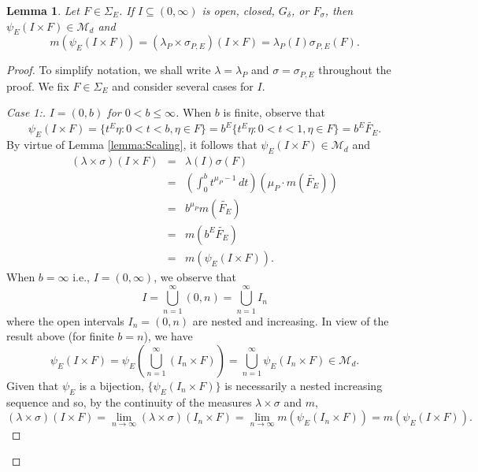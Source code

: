 \documentclass[11pt]{article}
\newtheorem{lemma}[theorem]{Lemma}
\newcommand*{\myproofname}{Proof}
\newenvironment{subproof}[1][\myproofname]{\begin{proof}[#1]\renewcommand*{\qedsymbol}{$\mathbin{/\mkern-6mu/}$}}{\end{proof}}
\begin{document}
\begin{lemma}\label{lem:SpecialRectangle}
Let $F\in\Sigma_E$. If $I\subseteq (0,\infty)$ is open, closed, $G_\delta$, or $F_\sigma$, then $\psi_E(I\times F)\in\mathcal{M}_d$ and
\begin{equation}\label{eq:SpecialRectangle}
m(\psi_E(I\times F))=(\lambda_P\times\sigma_{P,E})(I\times F)=\lambda_P(I)\sigma_{P,E}(F).
\end{equation}
\end{lemma}
\begin{proof}
To simplify notation, we shall write $\lambda=\lambda_P$ and $\sigma=\sigma_{P,E}$ throughout the proof. We fix $F\in\Sigma_E$ and consider several cases for $I$.\\

\begin{subproof}[Case 1:]\textit{$I=(0,b)$ for $0<b\leq \infty$.} When $b$ is finite, observe that
\begin{equation*}
\psi_E(I\times F)=\{t^E\eta:0<t<b,\eta\in F\}=b^E\{t^E\eta:0<t<1,\eta \in F\}=b^E\widetilde{F_E}.
\end{equation*}
By virtue of Lemma \ref{lemma:Scaling}, it follows that $\psi_E(I\times F)\in\mathcal{M}_d$ and
\begin{eqnarray*}
(\lambda\times\sigma)(I\times F)&=&\lambda(I)\sigma(F)\\
&=&\left(\int_0^b t^{\mu_P-1}\,dt\right)\left(\mu_P\cdot m(\widetilde{F_E})\right)\\
&=&b^{\mu_P}m(\widetilde{F_E})\\
&=&m(b^{E}\widetilde{F_E})\\
&=&m(\psi_E(I\times F)).
\end{eqnarray*}
When $b=\infty$ i.e., $I=(0,\infty)$, we observe that
\begin{equation*}
I=\bigcup_{n=1}^\infty (0,n)=\bigcup_{n=1}^\infty I_n
\end{equation*}
where the open intervals $I_n=(0,n)$ are nested and increasing. In view of the result above (for finite $b=n$), we have
\begin{equation*}\psi_E(I\times F)=\psi_E\left(\bigcup_{n=1}^\infty (I_n\times F)\right)=\bigcup_{n=1}^\infty\psi_E(I_n\times F)\in\mathcal{M}_d.
\end{equation*}
Given that $\psi_E$ is a bijection, $\{\psi_E(I_n\times F)\}$ is necessarily a nested increasing sequence and so, by the continuity of the measures $\lambda\times\sigma$ and $m$,
\begin{equation*}
(\lambda\times\sigma)(I\times F)=\lim_{n\to\infty}(\lambda\times\sigma)(I_n\times F)=\lim_{n\to\infty}m(\psi_E(I_n\times F))= m(\psi_E(I\times F)). 
\end{equation*}
\end{subproof}


\end{proof}
\end{document}
